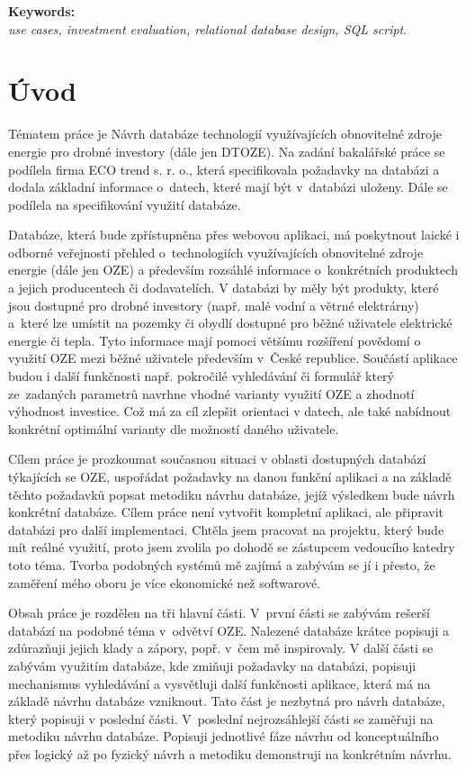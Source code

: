 \documentclass[11pt,a4paper]{article}
\begin{document}
\noindent \textbf{Keywords:}\\
\textit{use cases, investment evaluation, relational database design, SQL script}.

\newpage
\tableofcontents
\newpage

\onehalfspacing
\section{Úvod}
Tématem práce je Návrh databáze technologií využívajících obnovitelné zdroje energie pro drobné investory (dále jen DTOZE). Na zadání bakalářské práce se podílela firma ECO trend s. r. o., která specifikovala požadavky na databázi a dodala základní informace o~datech, které mají být v~databázi uloženy. Dále se podílela na specifikování využití databáze.

Databáze, která bude zpřístupněna přes webovou aplikaci, má poskytnout laické i odborné veřejnosti přehled o~technologiích využívajících obnovitelné zdroje energie (dále jen OZE) a především rozsáhlé informace o~konkrétních produktech a jejich producentech či dodavatelích. V databázi by měly být produkty, které jsou dostupné pro drobné investory (např. malé vodní a větrné elektrárny) a~které lze umístit na pozemky či obydlí dostupné pro běžné uživatele elektrické energie či tepla. Tyto informace mají pomoci většímu rozšíření povědomí o využití OZE mezi běžné uživatele především v~České republice. Součástí aplikace budou i další funkčnosti např. pokročilé vyhledávání či formulář který ze~zadaných parametrů navrhne vhodné varianty využití OZE a zhodnotí výhodnost investice. Což má za cíl zlepšit orientaci v datech, ale také nabídnout konkrétní optimální varianty dle možností daného uživatele. 

Cílem práce je prozkoumat současnou situaci v oblasti dostupných databází týkajících se OZE, uspořádat požadavky na danou funkční aplikaci a na základě těchto požadavků popsat metodiku návrhu databáze, jejíž výsledkem bude návrh konkrétní databáze. Cílem práce není vytvořit kompletní aplikaci, ale připravit databázi pro další implementaci.
Chtěla jsem pracovat na projektu, který bude mít reálné využití, proto jsem zvolila po dohodě se zástupcem vedoucího katedry toto téma. Tvorba podobných systémů mě zajímá a zabývám se jí i přesto, že zaměření mého oboru je více ekonomické než softwarové.   

Obsah práce je rozdělen na tři hlavní části. V~první části se zabývám rešerší databází na podobné téma v~odvětví OZE. Nalezené databáze krátce popisuji a zdůrazňuji jejich klady a zápory, popř. v~čem mě inspirovaly. V další části se zabývám využitím databáze, kde zmiňuji požadavky na databázi, popisuji mechanismus vyhledávání a vysvětluji další funkčnosti aplikace, která má na základě návrhu databáze vzniknout. Tato část je nezbytná pro návrh databáze, který popisuji v poslední části. V~poslední nejrozsáhlejší části se zaměřuji na metodiku návrhu databáze. Popisuji jednotlivé fáze návrhu od konceptuálního přes logický až po fyzický návrh a metodiku demonstruji na konkrétním návrhu.  
\end{document}
